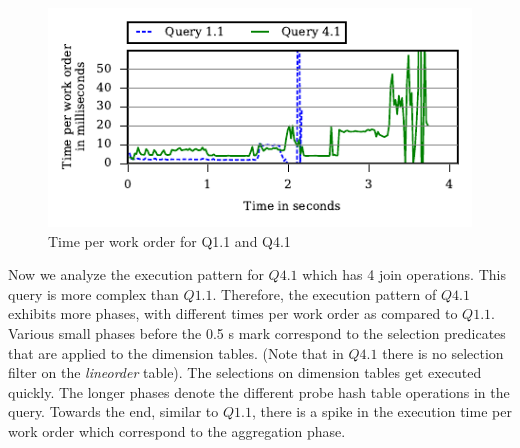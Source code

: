 \begin{figure}[h]
	\centering
	\includegraphics[width=\columnwidth]{figures/q11-q41-time-per-wo.pdf}
	\vspace{-2.5em}
	\caption{Time per work order for Q1.1 and Q4.1}
	\label{fig:q1.1-q4.1-time-per-wo}
\end{figure}

Now we analyze the execution pattern for $Q4.1$ which has 4 join operations. 
This query is more complex than $Q1.1$.%
Therefore, the execution pattern of $Q4.1$ exhibits more phases, with different times per work order as compared to $Q1.1$.
Various small phases before the 0.5 s mark correspond to the selection predicates that are applied to the dimension tables. (Note that in $Q4.1$ there is no selection filter on the \textit{lineorder} table).
The selections on dimension tables get executed quickly.
The longer phases denote the different probe hash table operations in the query.
Towards the end, similar to $Q1.1$, there is a spike in the execution time per work order which correspond to the aggregation phase.

